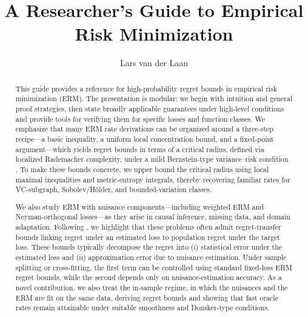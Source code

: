 \documentclass[11pt]{article}
\title{A Researcher’s Guide to Empirical Risk Minimization}
\author{Lars van der Laan}
\affil{Department of Statistics, University of Washington}
\theoremstyle{plain}
\theoremstyle{definition} %
\newcommand{\slightspacing}{\setstretch{1.175}}
\begin{document}
\maketitle

\slightspacing

 

\begin{abstract}
This guide provides a reference for high-probability regret bounds in empirical risk minimization (ERM). The presentation is modular: we begin with intuition and general proof strategies, then state broadly applicable guarantees under high-level conditions and provide tools for verifying them for specific losses and function classes. We emphasize that many ERM rate derivations can be organized around a three-step recipe---a basic inequality, a uniform local concentration bound, and a fixed-point argument---which yields regret bounds in terms of a critical radius, defined via localized Rademacher complexity, under a mild Bernstein-type variance--risk condition \citep{bartlett2005local,wainwright2019high}. To make these bounds concrete, we upper bound the critical radius using local maximal inequalities and metric-entropy integrals, thereby recovering familiar rates for VC-subgraph, Sobolev/H\"older, and bounded-variation classes.

We also study ERM with nuisance components---including weighted ERM and Neyman-orthogonal losses---as they arise in causal inference, missing data, and domain adaptation. Following \citet{foster2023orthogonal}, we highlight that these problems often admit regret-transfer bounds linking regret under an estimated loss to population regret under the target loss. These bounds typically decompose the regret into (i) statistical error under the estimated loss and (ii) approximation error due to nuisance estimation. Under sample splitting or cross-fitting, the first term can be controlled using standard fixed-loss ERM regret bounds, while the second depends only on nuisance-estimation accuracy. As a novel contribution, we also treat the in-sample regime, in which the nuisances and the ERM are fit on the same data, deriving regret bounds and showing that fast oracle rates remain attainable under suitable smoothness and Donsker-type conditions. 
\end{abstract}

\begingroup
\setcounter{tocdepth}{2} %
\renewcommand{\contentsname}{Table of contents}
\tableofcontents
\endgroup
\bigskip
\end{document}
